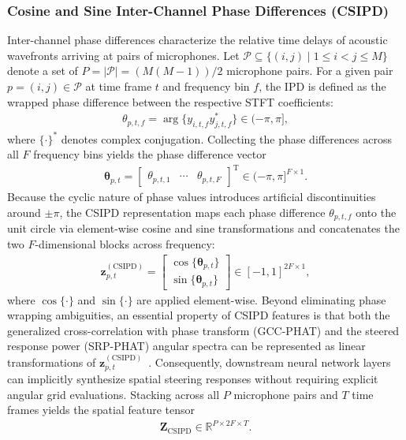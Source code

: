 \documentclass[lettersize,journal]{IEEEtran}
\begin{document}
\subsubsection{Cosine and Sine Inter-Channel Phase Differences (CSIPD)}
\label{sec:feat_csipd}
Inter-channel phase differences characterize the relative time delays of acoustic wavefronts arriving at pairs of microphones. Let $\mathcal{P} \subseteq \{(i, j) \mid 1 \le i < j \le M\}$ denote a set of $P = |\mathcal{P}| = (M(M-1))/2$ microphone pairs. For a given pair $p = (i, j) \in \mathcal{P}$ at time frame $t$ and frequency bin $f$, the \gls{IPD} is defined as the wrapped phase difference between the respective \gls{STFT} coefficients:
\begin{align}
  \theta_{p,t,f} = \arg\{y_{i,t,f} y_{j,t,f}^*\} \in (-\pi, \pi],
  \label{eq:feat_ipd_scalar}
\end{align}
where $\{\cdot\}^*$ denotes complex conjugation. Collecting the phase differences across all $F$ frequency bins yields the phase difference vector
\begin{align}
  \bm{\theta}_{p,t} = \begin{bmatrix} \theta_{p,t,1} & \cdots & \theta_{p,t,F} \end{bmatrix}^{\mathrm{T}} \in (-\pi, \pi]^{F \times 1}.
  \label{eq:feat_ipd_vec}
\end{align}
Because the cyclic nature of phase values introduces artificial discontinuities around $\pm\pi$, the \gls{CSIPD} representation maps each phase difference $\theta_{p,t,f}$ onto the unit circle via element-wise cosine and sine transformations and concatenates the two $F$-dimensional blocks across frequency:
\begin{align}
  \mathbf{z}_{p,t}^{(\mathrm{CSIPD})} = \begin{bmatrix} \cos\{\bm{\theta}_{p,t}\} \\ \sin\{\bm{\theta}_{p,t}\} \end{bmatrix} \in [-1, 1]^{2F \times 1},
  \label{eq:feat_csipd_vec}
\end{align}
where $\cos\{\cdot\}$ and $\sin\{\cdot\}$ are applied element-wise. Beyond eliminating phase wrapping ambiguities, an essential property of \gls{CSIPD} features is that both the generalized cross-correlation with phase transform (GCC-PHAT) and the steered response power (SRP-PHAT) angular spectra can be represented as linear transformations of $\mathbf{z}_{p,t}^{(\mathrm{CSIPD})}$~\cite{cornell2022overlapped}. Consequently, downstream neural network layers can implicitly synthesize spatial steering responses without requiring explicit angular grid evaluations.
Stacking across all $P$ microphone pairs and $T$ time frames yields the spatial feature tensor
\begin{align}
  \mathbf{Z}_{\mathrm{CSIPD}} \in \mathbb{R}^{P \times 2F \times T}.
  \label{eq:feat_csipd_tensor}
\end{align}
\end{document}
